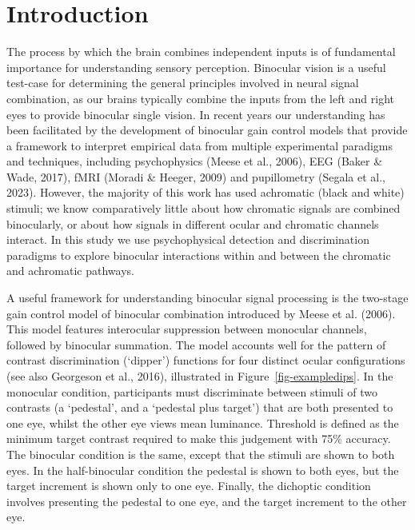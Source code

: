 \documentclass[
  letterpaper,
  DIV=11,
  numbers=noendperiod]{scrartcl}
\begin{document}
\hypertarget{introduction}{%
\section{Introduction}\label{introduction}}

The process by which the brain combines independent inputs is of
fundamental importance for understanding sensory perception. Binocular
vision is a useful test-case for determining the general principles
involved in neural signal combination, as our brains typically combine
the inputs from the left and right eyes to provide binocular single
vision. In recent years our understanding has been facilitated by the
development of binocular gain control models that provide a framework to
interpret empirical data from multiple experimental paradigms and
techniques, including psychophysics (Meese et al., 2006), EEG (Baker \&
Wade, 2017), fMRI (Moradi \& Heeger, 2009) and pupillometry (Segala et
al., 2023). However, the majority of this work has used achromatic
(black and white) stimuli; we know comparatively little about how
chromatic signals are combined binocularly, or about how signals in
different ocular and chromatic channels interact. In this study we use
psychophysical detection and discrimination paradigms to explore
binocular interactions within and between the chromatic and achromatic
pathways.

A useful framework for understanding binocular signal processing is the
two-stage gain control model of binocular combination introduced by
Meese et al. (2006). This model features interocular suppression between
monocular channels, followed by binocular summation. The model accounts
well for the pattern of contrast discrimination (`dipper') functions for
four distinct ocular configurations (see also Georgeson et al., 2016),
illustrated in Figure~\ref{fig-exampledips}. In the monocular condition,
participants must discriminate between stimuli of two contrasts (a
`pedestal', and a `pedestal plus target') that are both presented to one
eye, whilst the other eye views mean luminance. Threshold is defined as
the minimum target contrast required to make this judgement with 75\%
accuracy. The binocular condition is the same, except that the stimuli
are shown to both eyes. In the half-binocular condition the pedestal is
shown to both eyes, but the target increment is shown only to one eye.
Finally, the dichoptic condition involves presenting the pedestal to one
eye, and the target increment to the other eye.
\end{document}
